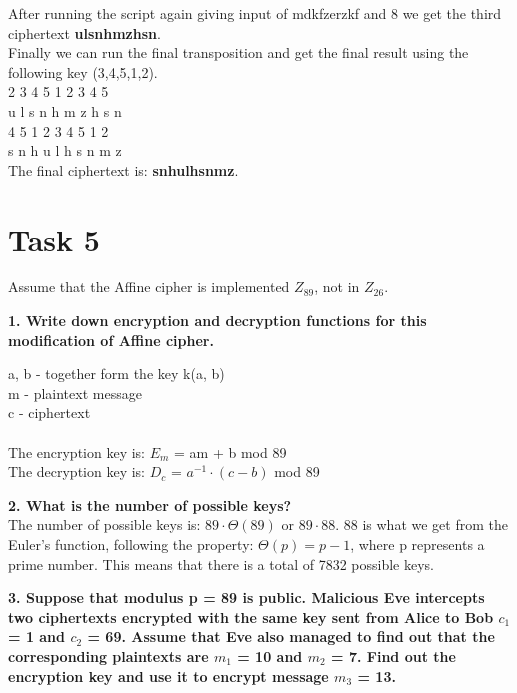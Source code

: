 \documentclass[12pt]{article}
\begin{document}
\noindent After running the script again giving input of mdkfzerzkf and 8 we get the
third ciphertext \textbf{ulsnhmzhsn}. \\

\noindent Finally we can run the final transposition and get the final result using
the following key (3,4,5,1,2). \\

  2  3  4  5  1  2  3  4  5 \\
u  l  s  n  h  m  z  h  s  n \\ 

  4  5  1  2  3  4  5  1  2 \\
s  n  h  u  l  h  s  n  m  z \\

\noindent The final ciphertext is: \textbf{snhulhsnmz}.


\section*{Task 5}

Assume that the Affine cipher is implemented $Z_{89}$, not in $Z_{26}$.
\newline

\noindent
\textbf{1. Write down encryption and decryption functions for this modification of Affine cipher.}\newline

\noindent a, b - together form the key k(a, b) \\
m - plaintext message \\
c - ciphertext \\\\
\noindent The encryption key is: $E_m$ = am + b mod 89 \\
The decryption key is: $D_c$ = $a^{-1} \cdot (c - b)$ mod 89 \pagebreak 

\noindent \textbf{2. What is the number of possible keys?}
\newline
\noindent
\\The number of possible keys is: $89 \cdot \Theta(89)$ or $89 \cdot 88$. 88 is 
what we get from the Euler's function, following the property: $\Theta(p) = p - 1$, 
where p represents a prime number. This means that there is a total of 7832 possible
keys.
\newline

\noindent \textbf{3. Suppose that modulus p = 89 is public. Malicious Eve intercepts 
two ciphertexts encrypted with the same key sent from Alice to Bob $c_1$ = 1 and
$c_2$ = 69. Assume that Eve also managed to find out that the corresponding 
plaintexts are $m_1$ = 10 and $m_2$ = 7. Find out the encryption key and use it 
to encrypt message $m_3$ = 13.}
\newline
\end{document}
